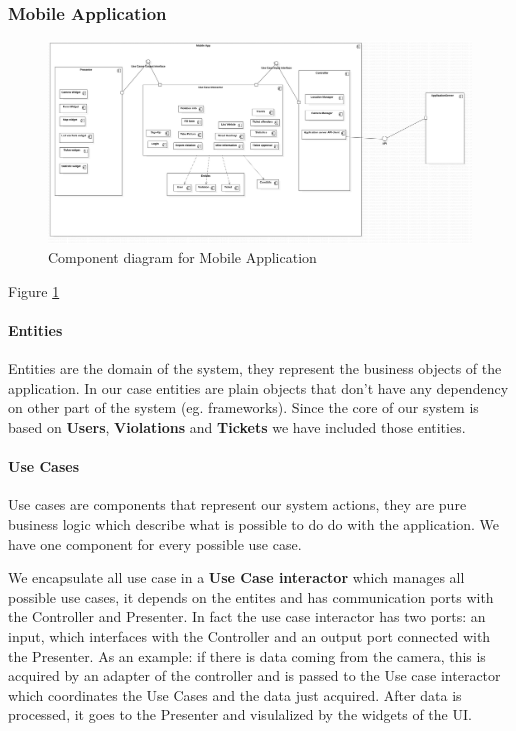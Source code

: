 \subsubsection{Mobile Application}
\begin{figure}
\centering
\includegraphics[width=\textwidth]{Images/ComponentDiagram1.png}
\caption{\label{fig:compdiag1} Component diagram for Mobile Application}
\end{figure}

Figure \ref{fig:compdiag1}

\paragraph{Entities}
Entities are the domain of the system, they represent the business objects of the application. In our case entities are plain objects that don't have any dependency on other part of the system (eg. frameworks).
Since the core of our system is based on \textbf{Users}, \textbf{Violations} and \textbf{Tickets} we have included those entities.

\paragraph{Use Cases}
Use cases are components that represent our system actions, they are pure business logic which describe what is possible to do do with the application. We have one component for every possible use case.

We encapsulate all use case in a \textbf{Use Case interactor} which manages all possible use cases, it depends on the entites and has communication ports with the Controller and Presenter.
In fact the use case interactor has two ports: an input, which interfaces with the Controller and an output port connected with the Presenter. As an example: if there is data coming from the camera, this is acquired by an adapter of the controller and is passed to the Use case interactor which coordinates the Use Cases and the data just acquired. After data is processed, it goes to the Presenter and visulalized by the widgets of the UI.

